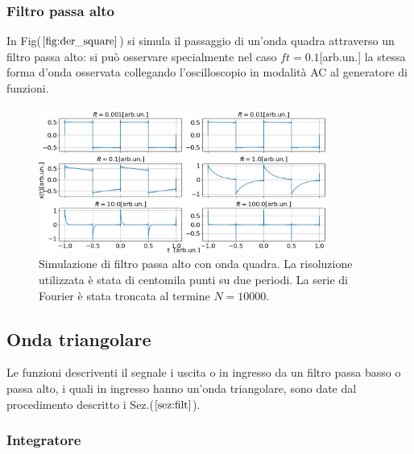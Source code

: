 \documentclass{article}
\begin{document}
            \subsubsection{Filtro passa alto}
                In Fig($\ref{fig:der_square}$) si simula il passaggio di un'onda quadra
                attraverso un filtro passa alto: si  può osservare specialmente 
                nel caso $ft=0.1$[arb.un.] la stessa forma d'onda osservata collegando 
                l'oscilloscopio in modalità AC al generatore di funzioni.
                    \begin{figure}[H]
                        \centering
                        \includegraphics[width=0.85\textwidth]{der_square.png} %
                        \caption{Simulazione di filtro passa alto con onda quadra.
                        La risoluzione utilizzata è stata di centomila punti su due periodi.
                        La serie di Fourier è stata troncata al termine $N=10000$.}
                        \label{fig:der_square}
                    \end{figure}


    \subsection{Onda triangolare}
    Le funzioni descriventi il segnale i uscita o in ingresso da un filtro passa basso
    o passa alto, i quali in ingresso hanno un'onda triangolare, 
    sono date dal procedimento descritto i Sez.($\ref{sez:filt}$).
        \subsubsection{Integratore}
            
\end{document}
